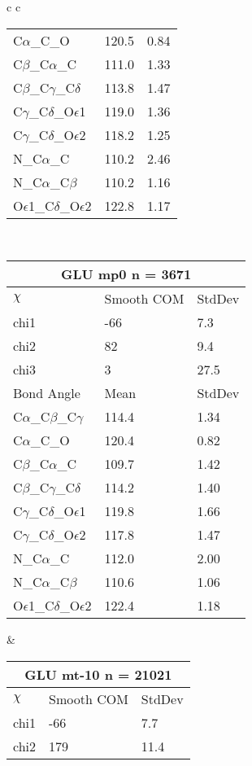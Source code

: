 \begin{longtable}{ c c }
\begin{tabular}{ l l l }
  C$\alpha$\_C\_O & 120.5 & 0.84\\
  C$\beta$\_C$\alpha$\_C & 111.0 & 1.33\\
  C$\beta$\_C$\gamma$\_C$\delta$ & 113.8 & 1.47\\
  C$\gamma$\_C$\delta$\_O$\epsilon$1 & 119.0 & 1.36\\
  C$\gamma$\_C$\delta$\_O$\epsilon$2 & 118.2 & 1.25\\
  N\_C$\alpha$\_C & 110.2 & 2.46\\
  N\_C$\alpha$\_C$\beta$ & 110.2 & 1.16\\
  O$\epsilon$1\_C$\delta$\_O$\epsilon$2 & 122.8 & 1.17\\
  \bottomrule
  \end{tabular}
  \\
  \begin{tabular}{ l l l }
  \toprule
  \multicolumn{3}{c}{GLU \textbf{mp0} n = 3671} \\ \toprule
  $\chi$       & Smooth COM & StdDev \\ \midrule
  chi1 & -66 & 7.3 \\ 
  chi2 & 82 & 9.4 \\ 
  chi3 & 3 & 27.5 \\ \midrule
  Bond Angle   & Mean     & StdDev \\ \midrule
  C$\alpha$\_C$\beta$\_C$\gamma$ & 114.4 & 1.34\\
  C$\alpha$\_C\_O & 120.4 & 0.82\\
  C$\beta$\_C$\alpha$\_C & 109.7 & 1.42\\
  C$\beta$\_C$\gamma$\_C$\delta$ & 114.2 & 1.40\\
  C$\gamma$\_C$\delta$\_O$\epsilon$1 & 119.8 & 1.66\\
  C$\gamma$\_C$\delta$\_O$\epsilon$2 & 117.8 & 1.47\\
  N\_C$\alpha$\_C & 112.0 & 2.00\\
  N\_C$\alpha$\_C$\beta$ & 110.6 & 1.06\\
  O$\epsilon$1\_C$\delta$\_O$\epsilon$2 & 122.4 & 1.18\\
  \bottomrule
  \end{tabular}
  &
  \begin{tabular}{ l l l }
  \toprule
  \multicolumn{3}{c}{GLU \textbf{mt-10} n = 21021} \\ \toprule
  $\chi$       & Smooth COM & StdDev \\ \midrule
  chi1 & -66 & 7.7 \\ 
  chi2 & 179 & 11.4 \\ 

\end{tabular}
\end{longtable}
